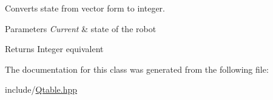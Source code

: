 Converts state from vector form to integer. 


\begin{DoxyParams}{Parameters}
{\em Current} & state of the robot \\
\hline
\end{DoxyParams}
\begin{DoxyReturn}{Returns}
Integer equivalent 
\end{DoxyReturn}


The documentation for this class was generated from the following file\+:\begin{DoxyCompactItemize}
\item 
include/\hyperlink{Qtable_8hpp}{Qtable.\+hpp}\end{DoxyCompactItemize}
